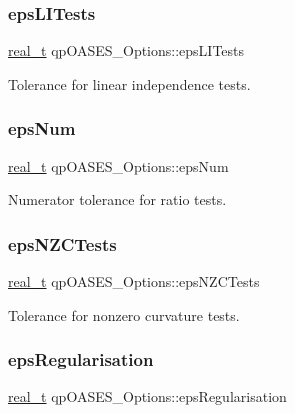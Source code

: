 \subsubsection{\texorpdfstring{eps\+L\+I\+Tests}{epsLITests}}
{\footnotesize\ttfamily \hyperlink{qp_o_a_s_e_s__wrapper_8h_a0d00e2b3dfadee81331bbb39068570c4}{real\+\_\+t} qp\+O\+A\+S\+E\+S\+\_\+\+Options\+::eps\+L\+I\+Tests}

Tolerance for linear independence tests. \mbox{\label{structqp_o_a_s_e_s___options_aace4f5280fa7652ae3a94233fd5b3426}} 
\subsubsection{\texorpdfstring{eps\+Num}{epsNum}}
{\footnotesize\ttfamily \hyperlink{qp_o_a_s_e_s__wrapper_8h_a0d00e2b3dfadee81331bbb39068570c4}{real\+\_\+t} qp\+O\+A\+S\+E\+S\+\_\+\+Options\+::eps\+Num}

Numerator tolerance for ratio tests. \mbox{\label{structqp_o_a_s_e_s___options_a1f9a6751236383f220f6ef59904e8145}} 
\subsubsection{\texorpdfstring{eps\+N\+Z\+C\+Tests}{epsNZCTests}}
{\footnotesize\ttfamily \hyperlink{qp_o_a_s_e_s__wrapper_8h_a0d00e2b3dfadee81331bbb39068570c4}{real\+\_\+t} qp\+O\+A\+S\+E\+S\+\_\+\+Options\+::eps\+N\+Z\+C\+Tests}

Tolerance for nonzero curvature tests. \mbox{\label{structqp_o_a_s_e_s___options_ae5d92f91af0387922a032775730de902}} 
\subsubsection{\texorpdfstring{eps\+Regularisation}{epsRegularisation}}
{\footnotesize\ttfamily \hyperlink{qp_o_a_s_e_s__wrapper_8h_a0d00e2b3dfadee81331bbb39068570c4}{real\+\_\+t} qp\+O\+A\+S\+E\+S\+\_\+\+Options\+::eps\+Regularisation}

